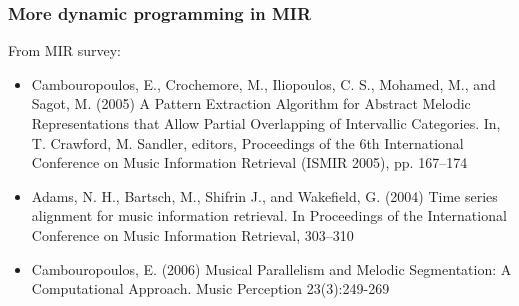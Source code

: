 \documentclass{beamer}
\begin{document}
\begin{frame}
	\frametitle{More dynamic programming in MIR}
	From MIR survey:
	\begin{itemize}
		\item
			Cambouropoulos, E., Crochemore, M., Iliopoulos, C. S., Mohamed, M., and Sagot, M. (2005) A Pattern Extraction Algorithm for Abstract Melodic Representations that Allow Partial Overlapping of Intervallic Categories. In, T. Crawford, M. Sandler, editors, Proceedings of the 6th International Conference on Music Information Retrieval (ISMIR 2005), pp. 167–174
		\item
			Adams, N. H., Bartsch, M., Shifrin J., and Wakefield, G. (2004) Time series alignment for music information retrieval. In Proceedings of the International Conference on Music Information Retrieval, 303–310 
		\item
			Cambouropoulos, E. (2006) Musical Parallelism and Melodic Segmentation: A Computational Approach. Music Perception 23(3):249-269 
	\end{itemize}
\end{frame}
\end{document}
